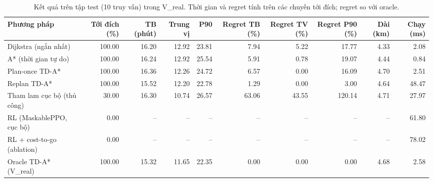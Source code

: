 \begin{table}[!htbp]
\centering
\small
\caption{Kết quả trên tập test (10 truy vấn) trong V\_real. Thời gian và regret tính trên các chuyến tới đích; regret so với oracle.}
\label{tab:tab_main_results}
\begin{adjustbox}{max width=\linewidth}
\begin{tabular}{lrrrrrrrrr}
\toprule
Phương pháp & Tới đích (\%) & TB (phút) & Trung vị & P90 & Regret TB (\%) & Regret TV (\%) & Regret P90 (\%) & Dài (km) & Chạy (ms) \\
\midrule
Dijkstra (ngắn nhất) & 100.00 & 16.20 & 12.92 & 23.81 & 7.94 & 5.22 & 17.77 & 4.33 & 2.08 \\
A* (thời gian tự do) & 100.00 & 16.24 & 12.92 & 25.54 & 5.91 & 0.78 & 19.07 & 4.44 & 0.84 \\
Plan-once TD-A* & 100.00 & 16.36 & 12.26 & 24.72 & 6.57 & 0.00 & 16.09 & 4.70 & 2.51 \\
Replan TD-A* & 100.00 & 15.52 & 12.20 & 22.78 & 1.29 & 0.00 & 3.00 & 4.64 & 48.47 \\
Tham lam cục bộ (thủ công) & 30.00 & 16.30 & 10.74 & 26.57 & 63.06 & 43.55 & 120.14 & 4.71 & 27.97 \\
RL (MaskablePPO, cục bộ) & 0.00 & -- & -- & -- & -- & -- & -- & -- & 61.80 \\
RL + cost-to-go (ablation) & 0.00 & -- & -- & -- & -- & -- & -- & -- & 78.02 \\
Oracle TD-A* (V\_real) & 100.00 & 15.32 & 11.65 & 22.35 & 0.00 & 0.00 & 0.00 & 4.68 & 2.58 \\
\bottomrule
\end{tabular}
\end{adjustbox}
\end{table}
